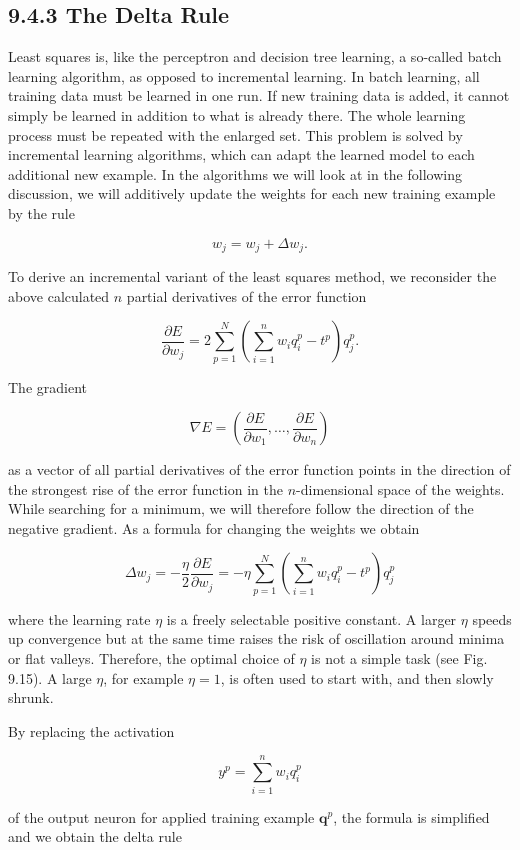 \documentclass[10pt]{article}
\begin{document}
\subsection*{9.4.3 The Delta Rule}
Least squares is, like the perceptron and decision tree learning, a so-called batch learning algorithm, as opposed to incremental learning. In batch learning, all training data must be learned in one run. If new training data is added, it cannot simply be learned in addition to what is already there. The whole learning process must be repeated with the enlarged set. This problem is solved by incremental learning algorithms, which can adapt the learned model to each additional new example. In the algorithms we will look at in the following discussion, we will additively update the weights for each new training example by the rule

$$
w_{j}=w_{j}+\Delta w_{j} .
$$

To derive an incremental variant of the least squares method, we reconsider the above calculated $n$ partial derivatives of the error function

$$
\frac{\partial E}{\partial w_{j}}=2 \sum_{p=1}^{N}\left(\sum_{i=1}^{n} w_{i} q_{i}^{p}-t^{p}\right) q_{j}^{p} .
$$

The gradient

$$
\nabla E=\left(\frac{\partial E}{\partial w_{1}}, \ldots, \frac{\partial E}{\partial w_{n}}\right)
$$

as a vector of all partial derivatives of the error function points in the direction of the strongest rise of the error function in the $n$-dimensional space of the weights. While searching for a minimum, we will therefore follow the direction of the negative gradient. As a formula for changing the weights we obtain

$$
\Delta w_{j}=-\frac{\eta}{2} \frac{\partial E}{\partial w_{j}}=-\eta \sum_{p=1}^{N}\left(\sum_{i=1}^{n} w_{i} q_{i}^{p}-t^{p}\right) q_{j}^{p}
$$

where the learning rate $\eta$ is a freely selectable positive constant. A larger $\eta$ speeds up convergence but at the same time raises the risk of oscillation around minima or flat valleys. Therefore, the optimal choice of $\eta$ is not a simple task (see Fig. 9.15). A large $\eta$, for example $\eta=1$, is often used to start with, and then slowly shrunk.

By replacing the activation

$$
y^{p}=\sum_{i=1}^{n} w_{i} q_{i}^{p}
$$

of the output neuron for applied training example $\boldsymbol{q}^{p}$, the formula is simplified and we obtain the delta rule
\end{document}
